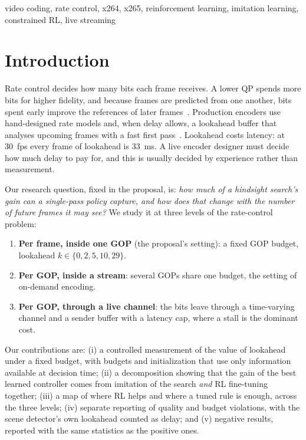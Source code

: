 \documentclass[conference]{IEEEtran}
\begin{document}
\begin{IEEEkeywords}
video coding, rate control, x264, x265, reinforcement learning, imitation learning, constrained RL, live streaming
\end{IEEEkeywords}

\section{Introduction}
Rate control decides how many bits each frame receives. A lower QP spends more bits for higher fidelity, and because frames are predicted from one another, bits spent early improve the references of later frames~\cite{sullivan1998rdo,ortega1998rd}. Production encoders use hand-designed rate models and, when delay allows, a lookahead buffer that analyses upcoming frames with a fast first pass~\cite{garrett2009mbtree,x264,x265,li2014lambda}. Lookahead costs latency: at 30~fps every frame of lookahead is 33~ms. A live encoder designer must decide how much delay to pay for, and this is usually decided by experience rather than measurement.

Our research question, fixed in the proposal, is: \emph{how much of a hindsight search's gain can a single-pass policy capture, and how does that change with the number of future frames it may see?} We study it at three levels of the rate-control problem:
\begin{enumerate}
\item \textbf{Per frame, inside one GOP} (the proposal's setting): a fixed GOP budget, lookahead $k\in\{0,2,5,10,29\}$.
\item \textbf{Per GOP, inside a stream}: several GOPs share one budget, the setting of on-demand encoding.
\item \textbf{Per GOP, through a live channel}: the bits leave through a time-varying channel and a sender buffer with a latency cap, where a stall is the dominant cost.
\end{enumerate}

Our contributions are: (i) a controlled measurement of the value of lookahead under a fixed budget, with budgets and initialization that use only information available at decision time; (ii) a decomposition showing that the gain of the best learned controller comes from imitation of the search \emph{and} RL fine-tuning together; (iii) a map of where RL helps and where a tuned rule is enough, across the three levels; (iv) separate reporting of quality and budget violations, with the scene detector's own lookahead counted as delay; and (v) negative results, reported with the same statistics as the positive ones.
\end{document}
